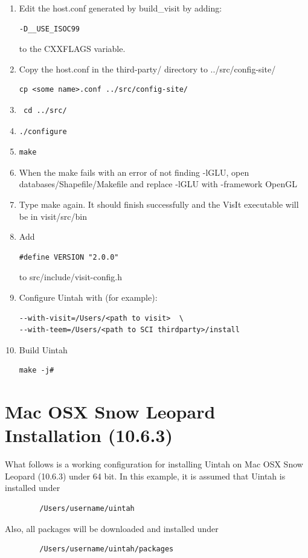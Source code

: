 \documentclass[12pt]{article}
\begin{document}
\begin{enumerate}
\begin{verbatim}
\end{verbatim}
\item Edit the host.conf generated by build\_visit by adding: 
\begin{verbatim}
-D__USE_ISOC99
\end{verbatim} 
 to the CXXFLAGS variable. 
\item Copy the host.conf in the third-party/ directory to ../src/config-site/ 
\begin{verbatim}
cp <some name>.conf ../src/config-site/
\end{verbatim}
\item \begin{verbatim} cd ../src/ \end{verbatim}
\item \begin{verbatim}./configure \end{verbatim} 
\item \begin{verbatim}make \end{verbatim}
\item When the make fails with an error of not finding -lGLU, open databases/Shapefile/Makefile and replace -lGLU with -framework OpenGL
\item Type make again. It should finish successfully and the VisIt executable will be in visit/src/bin
\item Add 
\begin{verbatim}
#define VERSION "2.0.0"
\end{verbatim}  
to src/include/visit-config.h
\item Configure Uintah with (for example): 
\begin{verbatim}
--with-visit=/Users/<path to visit>  \ 
--with-teem=/Users/<path to SCI thirdparty>/install
\end{verbatim}
\item Build Uintah
\begin{verbatim}
make -j# 
\end{verbatim}
\end{enumerate}  
\section{Mac OSX Snow Leopard Installation (10.6.3)}
	What follows is a working configuration for installing Uintah on Mac OSX Snow Leopard (10.6.3) under 64 bit. In this example, it is assumed that Uintah is installed under
	\begin{verbatim}
		/Users/username/uintah
	\end{verbatim}
	Also, all packages will be downloaded and installed under 
	\begin{verbatim}
		/Users/username/uintah/packages
	\end{verbatim}
\end{document}
